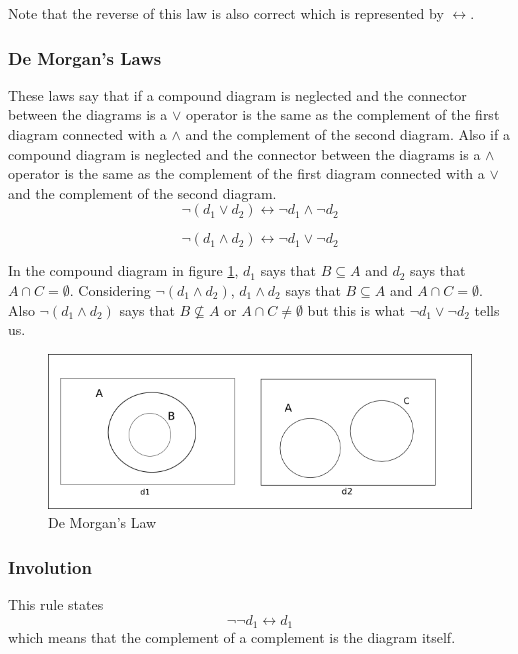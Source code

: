 \documentclass[10pt, a4paper, titlepage]{article}
\begin{document}
Note that the reverse of this law is also correct which is represented by $\longleftrightarrow$.  

\subsubsection{De Morgan's Laws}
These laws say that if a compound diagram is neglected and the connector between the diagrams is a $\vee$ operator is the same as the complement of the first diagram connected with a $\wedge$ and the complement of the second diagram. Also if a compound diagram is neglected and the connector between the diagrams is a $\wedge$ operator is the same as the complement of the first diagram connected with a $\vee$ and the complement of the second diagram.
$$ \neg(d_{1} \vee d_{2}) \longleftrightarrow \neg d_{1} \wedge \neg d_{2} $$

$$ \neg(d_{1} \wedge d_{2}) \longleftrightarrow \neg d_{1} \vee \neg d_{2} $$

In the compound diagram in figure \ref{d8}, $ d_{1} $ says that  $ B \subseteq A $ and $ d_{2} $ says that $ A \cap C = \emptyset $. Considering $ \neg (d_{1} \wedge d_{2}) $, $ d_{1} \wedge d_{2} $ says that $ B \subseteq A$ and $A \cap C = \emptyset $. Also $ \neg (d_{1} \wedge d_{2}) $ says that $ B \nsubseteq A $ or $ A \cap C \neq \emptyset $ but this is what $ \neg d_{1} \vee \neg d_{2} $ tells us. 

\begin{figure}[h]
\centering
\includegraphics[scale=0.7]{images/d8.png}
\caption{De Morgan's Law}
\label{d8}
\end{figure}

\subsubsection{Involution}

This rule states 
$$ \neg \neg d_{1} \longleftrightarrow d_{1} $$
which means that the complement of a complement is the diagram itself.
\end{document}
